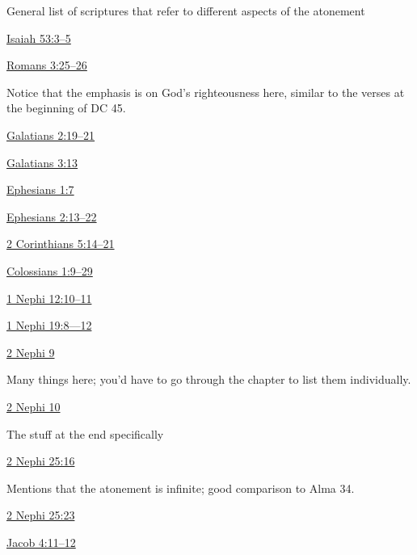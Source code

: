 		\begin{compactitem}
			\item General list of scriptures that refer to different aspects of the atonement
				\begin{compactitem}
					\item \hyperref[ISAIAH-53-3]{Isaiah 53:3--5}
					\item \hyperref[ROMANS-3-25]{Romans 3:25--26}
						\begin{compactitem}
							\item Notice that the emphasis is on God's righteousness here, similar to the verses at the beginning of DC 45.
						\end{compactitem}
					\item \hyperref[GALATIANS-2-19]{Galatians 2:19--21}
					\item \hyperref[GALATIANS-3-13]{Galatians 3:13}
					\item \hyperref[EPHESIANS-1-7]{Ephesians 1:7}
					\item \hyperref[EPHESIANS-2-13]{Ephesians 2:13--22}
					\item \hyperref[2CORINTHIANS-5-14]{2 Corinthians 5:14--21}
					\item \hyperref[COLOSSIANS-1-9]{Colossians 1:9--29}
					\item \hyperref[1NEPHI-12-10]{1 Nephi 12:10--11}
					\item \hyperref[1NEPHI-19-8]{1 Nephi 19:8---12}
					\item \hyperref[2NEPHI-9]{2 Nephi 9} 
						\begin{compactitem}
							\item Many things here; you'd have to go through the chapter to list them individually.
						\end{compactitem}
					\item \hyperref[2NEPHI-10]{2 Nephi 10} 
						\begin{compactitem}
							\item The stuff at the end specifically
						\end{compactitem}
					\item \hyperref[2NEPHI-25-16]{2 Nephi 25:16}
						\begin{compactitem}
							\item Mentions that the atonement is infinite; good comparison to Alma 34.
						\end{compactitem}
					\item \hyperref[2NEPHI-25-23]{2 Nephi 25:23}
					\item \hyperref[JACOB-4-11]{Jacob 4:11--12}

\end{compactitem}
\end{compactitem}
